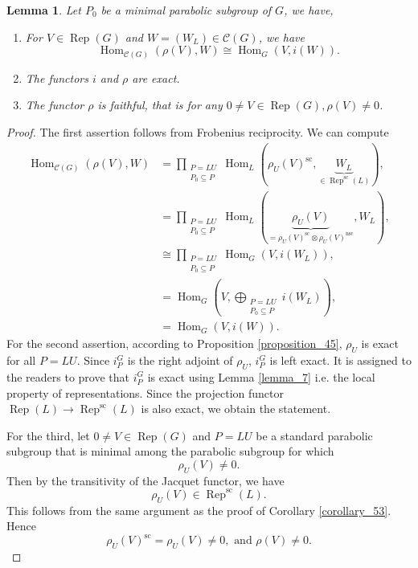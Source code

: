 \documentclass[8pt]{article}
\newtheorem{lemma}{Lemma}[section]
\DeclareMathOperator{\Rep}{Rep}
\DeclareMathOperator{\Hom}{Hom}
\DeclareMathOperator{\supcus}{sc}
\DeclareMathOperator{\nsc}{nsc}
\newcommand{\cat}{\mathscr{C}}
\begin{document}
\begin{lemma}
  Let $P_0$ be a minimal parabolic subgroup of $G$, we have,
  \begin{enumerate}
    \item For $V\in\Rep(G)$ and $W = (W_L)\in\cat(G)$, we have 
    \begin{equation*}
      \Hom_{\cat(G)}(\rho(V),W)\cong \Hom_G(V,i(W)).
    \end{equation*}
    \item The functors $i$ and $\rho$ are exact.
    \item The functor $\rho$ is faithful, that is for any $0\not=V\in\Rep(G), \rho(V)\not=0$.
  \end{enumerate}
  \label{lemma_86}
\end{lemma}

\begin{proof}
  The first assertion follows from Frobenius reciprocity. We can compute 
  \begin{align*}
        \Hom_{\cat(G)}(\rho(V),W) & = \prod_{\substack{P=LU\\ P_0\subseteq P}}\Hom_L(\rho_U(V)^{\supcus},\underbrace{W_L}_{\in\Rep^{\supcus}(L)}),\\
    & = \prod_{\substack{P=LU\\ P_0\subseteq P}}\Hom_L(\underbrace{\rho_U(V)}_{=\rho_U(V)^{\supcus}\otimes\rho_U(V)^{\nsc}},W_L),\\
    &\cong\prod_{\substack{P=LU\\ P_0\subseteq P}}\Hom_G(V,i(W_L)),\\
    & = \Hom_G\left(V,\bigoplus_{\substack{P=LU\\ P_0\subseteq P}}i(W_L)\right),\\
    & = \Hom_G(V,i(W)).
  \end{align*}
  For the second assertion, according to Proposition \ref{proposition_45}, $\rho_U$ is exact for all $P=LU$. Since $i_P^G$ is the right adjoint of $\rho_U$, $i_P^G$ is left exact. It is assigned to the readers to prove that $i_P^G$ is exact using Lemma \ref{lemma_7} i.e. the local property of representations. 
  Since the projection functor $\Rep(L)\to\Rep^{\supcus}(L)$ is also exact, we obtain the statement.
  \par For the third, let $0\not=V\in\Rep(G)$ and $P=LU$ be a standard parabolic subgroup that is minimal among the parabolic subgroup for which 
  \begin{equation*}
    \rho_U(V)\not=0.
  \end{equation*}
  Then by the transitivity of the Jacquet functor, we have 
  \begin{equation*}
    \rho_U(V)\in\Rep^{\supcus}(L).
  \end{equation*}
  This follows from the same argument as the proof of Corollary \ref{corollary_53}. Hence 
  \begin{equation*}
    \rho_U(V)^{\supcus}=\rho_U(V)\not=0,\text{ and }\rho(V)\not=0.
  \end{equation*}
\end{proof}
\end{document}
